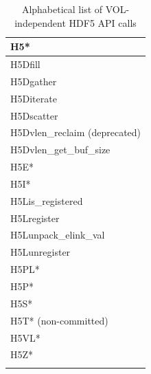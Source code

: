 \begin{longtable}{ |>{\raggedright\arraybackslash}p{\linewidth}| }
    \hline
    H5* \\
    \hline
    H5Dfill \\
    H5Dgather \\
    H5Diterate \\
    H5Dscatter \\
    H5Dvlen\_reclaim (deprecated) \\
    H5Dvlen\_get\_buf\_size \\
    \hline
    H5E* \\
    H5I* \\
    \hline
    H5Lis\_registered \\
    H5Lregister \\
    H5Lunpack\_elink\_val \\
    H5Lunregister \\
    \hline
    H5PL* \\
    H5P* \\
    H5S* \\
    H5T* (non-committed) \\
    H5VL* \\
    H5Z* \\
    \hline
\caption{Alphabetical list of VOL-independent HDF5 API calls}
\end{longtable}

